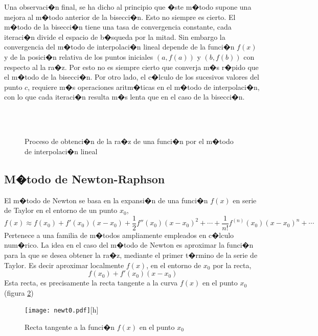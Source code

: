 Una observaci�n final, se ha dicho al principio que �ste m�todo supone una mejora al m�todo anterior de la bisecci�n. Esto no siempre es cierto. El m�todo de la bisecci�n tiene una tasa de convergencia constante, cada iteraci�n divide el espacio de b�squeda por la mitad. Sin embargo la convergencia del m�todo de interpolaci�n  lineal depende de la funci�n $f(x)$ y de la posici�n relativa de los puntos iniciales $(a, f(a))$  y $(b, f(b))$ con respecto al la ra�z. Por esto no es siempre cierto que converja m�s r�pido que el m�todo de  la bisecci�n. Por otro lado, el c�lculo de los sucesivos valores del punto $c$, requiere m�s operaciones aritm�ticas en el m�todo de interpolaci�n, con lo que cada iteraci�n resulta m�s lenta que en el caso de la bisecci�n.
\begin{figure}
\centering
{} \qquad
{}\\
\qquad
{}\\

\caption{Proceso de obtenci�n de la ra�z de una funci�n por el m�todo de interpolaci�n lineal}
\label{fig:iterr2}
\end{figure}

\subsection{M�todo de Newton-Raphson}
El m�todo de Newton se basa en la expansi�n de una funci�n $f(x)$ en serie de Taylor en el entorno de un punto $x_0$,
\begin{equation*}
f(x)\approx f(x_0)+f'(x_0)(x-x_0)+\frac{1}{2}f''(x_0)(x-x_0)^2+\cdots+\frac{1}{n!}f^{(n)}(x_0)(x-x_0)^n+\cdots
\end{equation*}
 Pertenece a una familia de m�todos ampliamente empleados en c�lculo num�rico. La idea en el caso del m�todo de Newton es aproximar la funci�n para la que se desea obtener la ra�z, mediante el primer t�rmino de la serie de Taylor. Es decir aproximar localmente $f(x)$, en el entorno de $x_0$ por la recta,
\begin{equation*}
 f(x_0)+f'(x_0)(x-x_0)
\end{equation*}
Esta recta, es precisamente la recta tangente a la curva $f(x)$ en el punto $x_0$ (figura \ref{fig:newton1})
\begin{figure}[h]
\centering
\texttt{[image: newt0.pdf]}[h]
\caption{Recta tangente a la funci�n $f(x)$ en el punto $x_0$}
\label{fig:newton1}
\end{figure}


